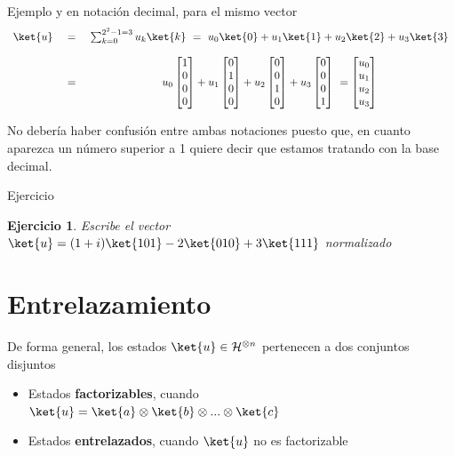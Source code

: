 \documentclass[a4paper,11pt]{book} %
\newtheorem{ejercicio_contador}{Ejercicio}
\newcommand{\Ejercicio}[1]{
		\begin{mybox_gray}{Ejercicio} 
			\begin{ejercicio_contador}
				 #1 
			\end{ejercicio_contador} 
		\end{mybox_gray}
	}
\numberwithin{equation}{chapter}
\begin{document}
\begin{mybox_green}{Ejemplo}
	y en notación decimal, para el mismo vector
	\begin{equation*}
	\begin{array}{ccc}
	\ket{u} ~&=& ~ \sum_{k=0}^{2^2-1=3} u_{k} \ket{k}~=~ u_{0}\ket{0}+ u_{1}\ket{1} + u_{2}\ket{2} +u_{3}\ket{3}
	\\ \\
	~&=&~ u_{0}\begin{bmatrix}1\\0\\0 \\ 0\end{bmatrix}+ u_{1}  \begin{bmatrix}0\\1\\0 \\ 0\end{bmatrix} + u_{2} 
	\begin{bmatrix}0\\0\\1\\0\end{bmatrix}+u_{3}  \begin{bmatrix}0\\0\\0\\1\end{bmatrix}   ~ = 
	\begin{bmatrix}u_{0}\\ u_{1}\\ u_{2} \\ u_{3}  \end{bmatrix}
	\end{array}
	\end{equation*}

	No debería haber confusión entre ambas notaciones puesto que, en cuanto aparezca un número superior a 1 quiere decir que 
	estamos tratando con la base decimal. 
	\end{mybox_green}

	\Ejercicio{Escribe el vector $\ket{u} = (1+i)\ket{101} -2\ket{010} + 3\ket{111}$ normalizado}
   

   
    \section{Entrelazamiento}



De forma  general, los estados $\ket{u}\in \mathcal{H}^{\otimes n}$ pertenecen a dos conjuntos disjuntos
\begin{itemize}
	\item Estados \textbf{factorizables}, cuando $\ket{u} = \ket{a}\otimes \ket{b}\otimes...\otimes \ket{c}$
	\item Estados \textbf{entrelazados}, cuando $\ket{u}$ no es factorizable
\end{itemize}
\end{document}
